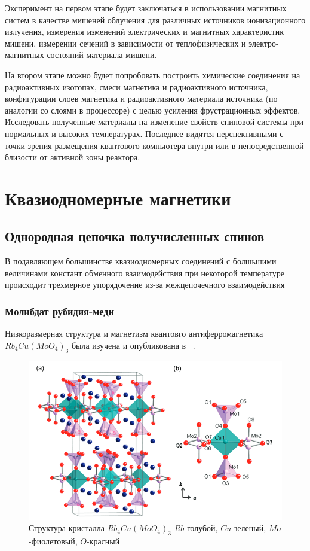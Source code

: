 \documentclass[11pt]{article}
\begin{document}
Эксперимент на первом этапе будет заключаться в использовании магнитных систем в качестве мишеней облучения для различных источников ионизационного излучения, измерения изменений электрических и магнитных характеристик мишени, измерении сечений в зависимости от теплофизических и электро-магнитных состояний материала мишени. 

 На втором этапе можно будет попробовать построить химические соединения на радиоактивных изотопах, смеси магнетика и радиоактивного источника, конфигурации слоев магнетика и радиоактивного материала источника (по аналогии со слоями в процессоре) с целью усиления фрустрационных эффектов. Исследовать полученные материалы на изменение свойств спиновой системы при нормальных и высоких температурах. Последнее видятся перспективными с точки зрения размещения квантового компьютера внутри или в непосредственной близости от активной зоны реактора.

\section{Квазиодномерные магнетики}
\subsection{Однородная цепочка получисленных спинов}
В подавляющем большинстве квазиодномерных соединений с болшьшими величинами констант обменного взаимодействия при некоторой температуре происходит трехмерное упорядочение из-за межцепочечного взаимодействия 
\subsubsection{Молибдат рубидия-меди}
Низкоразмерная структура и магнетизм квантовго антиферромагнетика $Rb_4Cu(MoO_4)_3$ была изучена и опубликована в ~\cite{ishii2010}.

\begin{figure}[htp]
\centering
\includegraphics[scale=0.55]{Rb_4Cu_MoO_4}
\caption{Структура кристалла $Rb_4Cu(MoO_4)_3$ $Rb$-голубой, $Cu$-зеленый, $Mo$-фиолетовый, $O$-красный ~\cite{ishii2010}}
\label{}
\end{figure}
\end{document}
